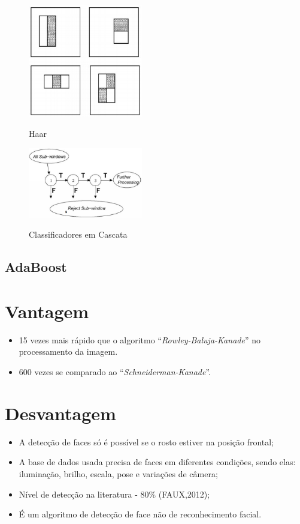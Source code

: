 \documentclass[12pt,a4paper]{article}
\begin{document}
\begin{figure}[h!]
\centering
\includegraphics[width=5cm]{recursos/imagens/Haar.png}
\label{2}
\caption{Haar}
\end{figure} 

\begin{figure}[h!]
\centering
\includegraphics[width=5cm]{recursos/imagens/cascata.png}
\label{3}
\caption{Classificadores em Cascata}
\end{figure} 



\subsection{AdaBoost}







\section{Vantagem}
\begin{itemize}
	\item 15 vezes mais rápido que o algoritmo “\textit{Rowley-Baluja-Kanade}” no processamento da imagem.

	\item 600 vezes se comparado ao “\textit{Schneiderman-Kanade}”.
\end{itemize}

\section{Desvantagem}
\begin{itemize}
	\item A detecção de faces só é possível se o rosto estiver na posição frontal;
	\item A base de dados usada precisa de faces em diferentes condições, sendo elas: iluminação, brilho, escala, pose e variações de câmera;
	\item Nível de detecção na literatura - 80\% (FAUX,2012);
	\item É um algoritmo de detecção de face não de reconhecimento facial.
\end{itemize}
\end{document}
